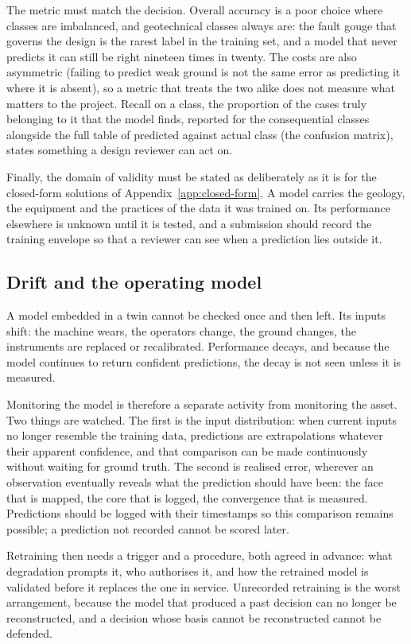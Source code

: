 The metric must match the decision. Overall accuracy is a poor choice where
classes are imbalanced, and geotechnical classes always are: the fault gouge
that governs the design is the rarest label in the training set, and a model
that never predicts it can still be right nineteen times in twenty. The
costs are also asymmetric (failing to predict weak ground is not the same error
as predicting it where it is absent), so a metric that treats the two alike
does not measure what matters to the project. Recall on a class, the
proportion of the cases truly belonging to it that the model finds, reported
for the consequential classes alongside the full table of predicted against
actual class (the confusion matrix), states something a design reviewer can
act on.

Finally, the domain of validity must be stated as deliberately as it is for
the closed-form solutions of Appendix~\ref{app:closed-form}. A model carries
the geology, the equipment and the practices of the data it was trained on.
Its performance elsewhere is unknown until it is tested,
and a submission should record the training envelope so
that a reviewer can see when a prediction lies outside it.

\subsection{Drift and the operating model}
\label{sec:ml-drift}

A model embedded in a twin cannot be checked once and then left. Its
inputs shift: the machine wears, the operators change, the ground changes, the
instruments are replaced or recalibrated. Performance decays, and
because the model continues to return confident predictions, the decay
is not seen unless it is measured.

Monitoring the model is therefore a separate activity from monitoring the
asset. Two things are watched. The first is the input distribution: when
current inputs no longer resemble the training data, predictions are
extrapolations whatever their apparent confidence, and that comparison can be
made continuously without waiting for ground truth. The second is realised
error, wherever an observation eventually reveals what the prediction should
have been: the face that is mapped, the core that is logged, the
convergence that is measured. Predictions should be logged with their
timestamps so this comparison remains possible; a prediction not recorded
cannot be scored later.

Retraining then needs a trigger and a procedure, both agreed in advance:
what degradation prompts it, who authorises it, and how the retrained model is
validated before it replaces the one in service. Unrecorded retraining is the
worst arrangement, because the model that produced a past decision
can no longer be reconstructed, and a decision whose basis cannot be
reconstructed cannot be defended.

